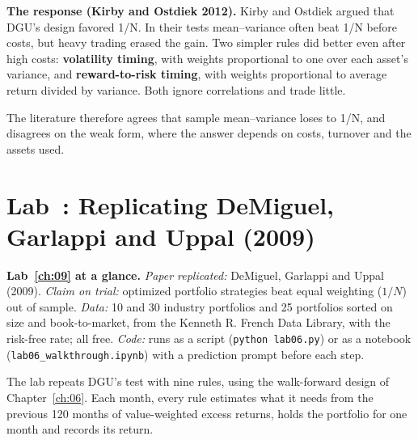 \textbf{The response (Kirby and Ostdiek 2012).} Kirby and Ostdiek argued that DGU's design favored 1/N. In their tests mean--variance often beat 1/N before costs, but heavy trading erased the gain. Two simpler rules did better even after high costs: \textbf{volatility timing}, with weights proportional to one over each asset's variance, and \textbf{reward-to-risk timing}, with weights proportional to average return divided by variance. Both ignore correlations and trade little.

The literature therefore agrees that sample mean--variance loses to 1/N, and disagrees on the weak form, where the answer depends on costs, turnover and the assets used.

\section{Lab~\thechapter: Replicating DeMiguel, Garlappi and Uppal (2009)}
\label{sec:12-lab}

\begin{callout}
\textbf{Lab~\ref{ch:09} at a glance.} \emph{Paper replicated:} DeMiguel, Garlappi and Uppal (2009). \emph{Claim on trial:} optimized portfolio strategies beat equal weighting ($1/N$) out of sample. \emph{Data:} 10 and 30 industry portfolios and 25 portfolios sorted on size and book-to-market, from the Kenneth R. French Data Library, with the risk-free rate; all free. \emph{Code:} runs as a script (\texttt{python lab06.py}) or as a notebook (\texttt{lab06\_walkthrough.ipynb}) with a prediction prompt before each step.
\end{callout}

The lab repeats DGU's test with nine rules, using the walk-forward design of Chapter~\ref{ch:06}. Each month, every rule estimates what it needs from the previous 120 months of value-weighted excess returns, holds the portfolio for one month and records its return.

